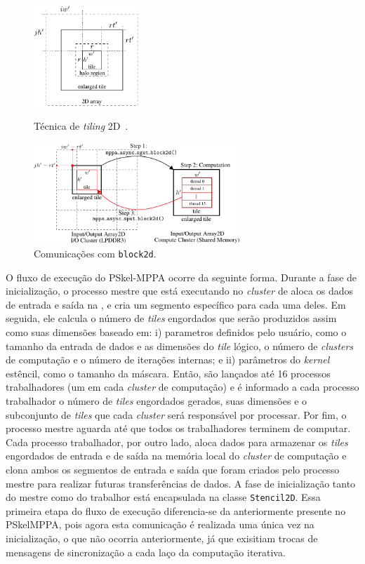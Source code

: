 \documentclass[a4paper,11pt]{article}
\newcommand{\pskelmppa}{PSkel-MPPA\xspace}
\begin{document}
\begin{figure}[htb]
  \begin{minipage}[b]{0.40\textwidth}
	\centering
	\includegraphics[height=3.8cm]{figs/tile.pdf}
	\caption{Técnica de \emph{tiling} 2D~\cite{Rocha:2017}.}
	\label{fig:gputile}
  \end{minipage}
  \begin{minipage}[b]{0.60\textwidth}
	\centering
	\includegraphics[height=3.8cm]{figs/pskel-mppa-fluxogram.pdf}
	\caption{Comunicações com \texttt{block2d}.}
    \label{fig:block2d}
  \end{minipage}
\end{figure}

O fluxo de execução do \pskelmppa ocorre da seguinte forma. Durante a fase de inicialização, o processo mestre que está executando no \emph{cluster} de \io aloca os dados de entrada e saída na \lpddr, e cria um segmento específico para cada uma deles. Em seguida, ele calcula o número de \emph{tiles} engordados que serão produzidos assim como suas dimensões baseado em: i) parametros definidos pelo usuário, como o tamanho da entrada de dados e as dimensões do \emph{tile} lógico, o número de \emph{clusters} de computação e o número de iterações internas; e ii) parâmetros do \emph{kernel} estêncil, como o tamanho da máscara. Então, são lançados até 16 processos trabalhadores (um em cada \emph{cluster} de computação) e é informado a cada processo trabalhador o número de \emph{tiles} engordados gerados, suas dimensões e o subconjunto de \emph{tiles} que cada \emph{cluster} será responsável por processar. Por fim, o processo mestre aguarda até que todos os trabalhadores terminem de computar.
%
Cada processo trabalhador, por outro lado, aloca dados para armazenar os \emph{tiles} engordados de entrada e de saída na memória local do \emph{cluster} de computação e clona ambos os segmentos de entrada e saída que foram criados pelo processo mestre para realizar futuras transferências de dados. A fase de inicialização tanto do mestre como do trabalhor está encapsulada na classe \texttt{Stencil2D}.
%
Essa primeira etapa do fluxo de execução diferencia-se da anteriormente presente no PSkelMPPA, pois agora esta comunicação é realizada uma única vez na inicialização, o que não ocorria anteriormente, já que exisitiam trocas de mensagens de sincronização a cada laço da computação iterativa.
\end{document}
